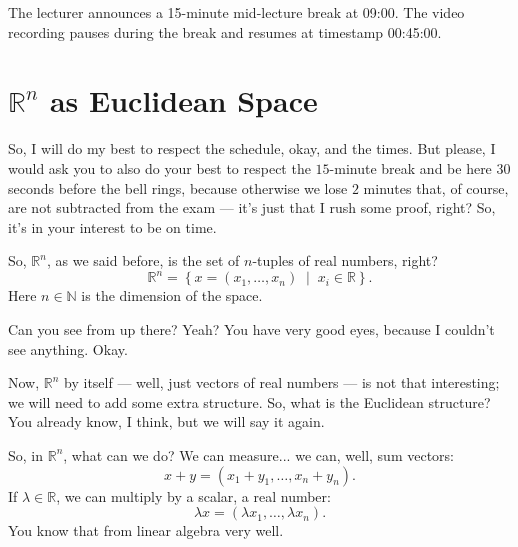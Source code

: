 \begin{lecture-break}
The lecturer announces a 15-minute mid-lecture break at 09:00. The video recording pauses during the break and resumes at timestamp 00:45:00.
\end{lecture-break}

\begin{ai-global-state-checkpoint-invisible-content}
\end{ai-global-state-checkpoint-invisible-content}

\section{\texorpdfstring{$\mathbb{R}^n$}{Rn} as Euclidean Space}

\begin{spoken-clean}[00:45:00 - 00:47:19]
So, I will do my best to respect the schedule, okay, and the times. But please, I would ask you to also do your best to respect the $15$-minute break and be here $30$ seconds before the bell rings, because otherwise we lose $2$ minutes that, of course, are not subtracted from the exam --- it's just that I rush some proof, right? So, it's in your interest to be on time.

So, $\mathbb{R}^n$, as we said before, is the set of $n$-tuples of real numbers, right?
\[
\mathbb{R}^n = \left\{ x = (x_1, \dots, x_n) \;\middle|\; x_i \in \mathbb{R} \right\}.
\]
Here $n \in \mathbb{N}$ is the dimension of the space.

Can you see from up there? Yeah? You have very good eyes, because I couldn't see anything. Okay.

Now, $\mathbb{R}^n$ by itself --- well, just vectors of real numbers --- is not that interesting; we will need to add some extra structure. So, what is the Euclidean structure? You already know, I think, but we will say it again.

So, in $\mathbb{R}^n$, what can we do? We can measure... we can, well, sum vectors:
\[
x + y = (x_1 + y_1, \dots, x_n + y_n).
\]
If $\lambda \in \mathbb{R}$, we can multiply by a scalar, a real number:
\[
\lambda x = (\lambda x_1, \dots, \lambda x_n).
\]
You know that from linear algebra very well.
\end{spoken-clean}


